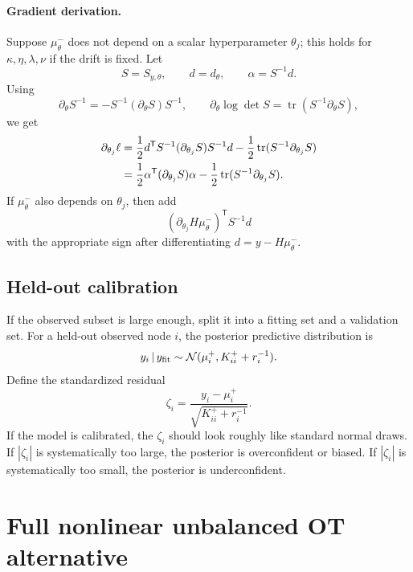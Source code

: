 \documentclass[11pt]{article}
\numberwithin{equation}{section}
\newcommand{\tr}{\operatorname{tr}}
\newcommand{\transpose}{^{\mathsf T}}
\newcommand{\given}{\,|\,}
\newcommand{\half}{\frac{1}{2}}
\begin{document}
\paragraph{Gradient derivation.}  Suppose $\mu^-_\theta$ does not depend on a scalar hyperparameter $\theta_j$; this holds for $\kappa,\eta,\lambda,\nu$ if the drift is fixed.  Let
\[
  S=S_{y,\theta},
  \qquad
  d=d_\theta,
  \qquad
  \alpha=S^{-1}d.
\]
Using
\[
  \partial_\theta S^{-1}=-S^{-1}(\partial_\theta S)S^{-1},
  \qquad
  \partial_\theta\log\det S=\tr(S^{-1}\partial_\theta S),
\]
we get
\begin{align}
  \partial_{\theta_j}\ell
  &=\half d\transpose S^{-1}(\partial_{\theta_j}S)S^{-1}d
    -\half\tr(S^{-1}\partial_{\theta_j}S)\notag\\
  &=\half\alpha\transpose(\partial_{\theta_j}S)\alpha
    -\half\tr(S^{-1}\partial_{\theta_j}S).
  \label{eq:marginal-gradient}
\end{align}
If $\mu^-_\theta$ also depends on $\theta_j$, then add
\begin{equation}
  (\partial_{\theta_j}H\mu^-_\theta)\transpose S^{-1}d
  \label{eq:marginal-gradient-mean-term}
\end{equation}
with the appropriate sign after differentiating $d=y-H\mu^-_\theta$.

\subsection{Held-out calibration}

If the observed subset is large enough, split it into a fitting set and a validation set.  For a held-out observed node $i$, the posterior predictive distribution is
\begin{equation}
  y_i\given y_{\rm fit}
  \sim\mathcal N(\mu_i^+,K^+_{ii}+r_i^{-1}).
  \label{eq:heldout-predictive}
\end{equation}
Define the standardized residual
\begin{equation}
  \zeta_i=\frac{y_i-\mu_i^+}{\sqrt{K^+_{ii}+r_i^{-1}}}.
  \label{eq:standardized-residual-final}
\end{equation}
If the model is calibrated, the $\zeta_i$ should look roughly like standard normal draws.  If $|\zeta_i|$ is systematically too large, the posterior is overconfident or biased.  If $|\zeta_i|$ is systematically too small, the posterior is underconfident.

\section{Full nonlinear unbalanced OT alternative}
\label{sec:full-nonlinear-uot}
\end{document}
